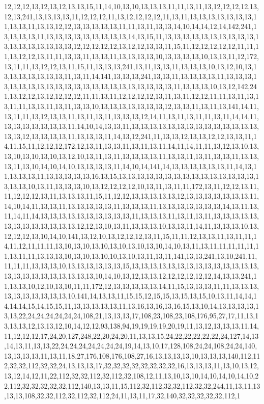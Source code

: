 12,12,12,13,12,13,12,13,13,15,11,14,10,13,10,13,13,13,11,11,13,11,13,12,12,12,12,13,12,13,241,13,13,13,13,11,12,12,12,11,13,12,12,12,12,11,13,11,13,13,13,13,13,13,13,11,13,13,11,13,13,12,12,13,13,13,13,13,11,11,13,11,13,13,14,10,14,14,12,14,142,241,13,13,13,13,11,13,13,13,13,13,13,13,13,13,14,13,15,11,13,13,13,13,13,13,13,13,13,13,13,13,13,13,13,13,13,13,12,12,12,12,12,13,12,12,13,13,11,15,11,12,12,12,12,12,11,11,11,13,12,12,13,11,11,13,13,11,13,13,11,13,13,13,13,10,13,13,13,13,10,13,13,11,12,172,13,11,11,13,12,12,13,11,15,11,13,13,13,241,13,11,13,13,11,13,13,13,10,13,12,10,13,13,13,13,13,13,13,13,11,13,11,14,141,13,13,13,241,13,13,11,13,13,13,13,11,13,13,13,13,13,13,13,13,13,13,13,13,13,13,13,13,13,13,13,13,13,13,11,13,13,13,10,13,12,142,241,13,12,12,13,12,12,12,12,11,11,13,11,12,12,12,12,13,11,13,11,12,12,11,11,13,11,13,13,11,11,13,13,11,13,11,13,13,10,13,13,13,13,13,13,13,12,13,13,11,13,11,13,141,14,11,13,11,11,13,12,13,13,11,13,11,13,11,13,13,13,12,14,11,13,11,13,11,11,13,11,14,14,11,13,13,13,13,13,13,13,11,14,10,14,13,13,11,13,13,13,13,13,13,13,13,13,13,13,13,13,13,13,13,12,13,13,13,13,11,13,13,13,11,14,13,12,241,11,13,13,12,13,13,12,12,13,13,11,14,11,15,11,12,12,12,172,12,13,11,13,13,11,13,11,13,11,14,11,14,11,11,13,12,13,10,13,13,10,13,10,13,10,13,12,10,13,11,13,11,13,13,13,13,11,13,13,11,13,11,13,13,11,13,13,13,11,13,10,14,10,14,10,13,13,13,13,11,14,10,14,141,14,13,13,13,13,13,13,11,14,13,11,13,13,13,11,13,13,13,13,13,16,13,15,13,13,13,13,13,13,13,13,13,13,13,13,13,13,13,13,13,13,10,13,11,13,13,13,10,13,12,12,12,12,10,13,11,13,11,11,172,13,11,12,12,13,11,11,12,12,12,13,11,13,13,13,11,15,11,12,12,13,13,13,13,13,12,13,13,13,13,13,13,13,11,14,10,14,11,13,13,11,13,13,13,13,13,11,13,13,13,11,13,13,13,13,13,13,13,14,13,11,13,11,14,11,14,13,13,13,13,13,13,13,13,13,13,11,13,13,13,11,13,11,13,11,13,13,13,13,13,13,13,13,13,13,13,13,13,12,12,13,10,13,11,13,13,13,10,13,13,11,14,11,13,13,13,10,13,12,12,12,13,10,14,10,141,13,12,10,13,12,12,12,13,11,15,11,11,12,13,13,11,13,11,11,14,11,12,11,11,11,13,10,13,10,13,10,13,10,13,10,13,10,14,10,13,11,13,11,11,11,11,11,11,13,11,11,13,13,13,10,13,10,13,10,10,13,10,13,11,13,11,141,13,13,241,13,10,241,11,11,11,11,13,13,13,10,13,13,13,13,13,13,15,13,13,13,13,13,13,13,13,13,13,13,13,13,13,13,13,13,13,13,13,13,13,13,13,10,14,10,13,12,13,13,12,12,12,12,12,12,14,13,13,241,11,13,13,10,12,10,13,10,11,11,172,12,13,13,13,13,13,14,11,15,13,13,13,11,11,13,13,13,13,13,13,13,13,13,13,10,141,14,13,13,11,15,15,12,15,15,13,15,13,15,10,13,11,14,14,14,14,14,15,14,15,15,11,13,13,13,13,13,11,13,16,13,16,13,16,15,13,10,14,13,13,13,13,13,13,22,24,24,24,24,24,24,108,21,13,13,13,17,108,23,108,23,108,176,95,27,17,11,13,13,13,13,12,13,13,12,10,14,12,12,93,138,94,19,19,19,19,20,19,11,13,12,13,13,13,11,14,11,12,12,12,17,24,20,127,248,22,20,24,20,11,13,13,15,24,22,22,22,22,22,24,127,14,13,14,13,11,13,13,22,24,24,24,24,24,24,24,19,14,13,10,17,128,108,24,24,108,24,24,140,13,13,13,13,11,13,11,18,27,176,108,176,108,27,16,13,13,13,13,10,13,13,13,140,112,112,32,32,112,32,32,24,13,13,13,17,32,32,32,32,32,32,32,32,16,13,13,13,11,13,10,13,12,13,12,14,12,11,22,112,32,32,112,32,112,32,108,12,11,13,10,13,10,14,10,14,10,14,10,22,112,32,32,32,32,32,112,140,13,13,11,15,112,32,112,32,32,112,32,32,244,11,13,11,13,13,13,108,32,32,112,32,112,32,112,24,11,13,11,17,32,140,32,32,32,32,32,112,1